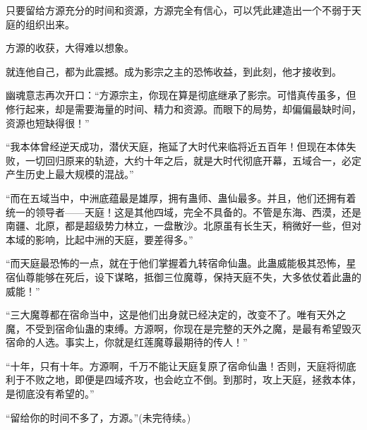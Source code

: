 \begin{this_body}
只要留给方源充分的时间和资源，方源完全有信心，可以凭此建造出一个不弱于天庭的组织出来。

方源的收获，大得难以想象。

就连他自己，都为此震撼。成为影宗之主的恐怖收益，到此刻，他才接收到。

幽魂意志再次开口：“方源宗主，你现在算是彻底继承了影宗。可惜真传虽多，但修行起来，却是需要海量的时间、精力和资源。而眼下的局势，却偏偏最缺时间，资源也短缺得很！”

“我本体曾经逆天成功，潜伏天庭，拖延了大时代来临将近五百年！但现在本体失败，一切回归原来的轨迹，大约十年之后，就是大时代彻底开幕，五域合一，必定产生历史上最大规模的混战。”

“而在五域当中，中洲底蕴最是雄厚，拥有蛊师、蛊仙最多。并且，他们还拥有着统一的领导者——天庭！这是其他四域，完全不具备的。不管是东海、西漠，还是南疆、北原，都是超级势力林立，一盘散沙。北原虽有长生天，稍微好一些，但对本域的影响，比起中洲的天庭，要差得多。”

“而天庭最恐怖的一点，就在于他们掌握着九转宿命仙蛊。此蛊威能极其恐怖，星宿仙尊能够在死后，设下谋略，抵御三位魔尊，保持天庭不失，大多依仗着此蛊的威能！”

“三大魔尊都在宿命当中，这是他们出身就已经决定的，改变不了。唯有天外之魔，不受到宿命仙蛊的束缚。方源啊，你现在是完整的天外之魔，是最有希望毁灭宿命的人选。事实上，你就是红莲魔尊最期待的传人！”

“十年，只有十年。方源啊，千万不能让天庭复原了宿命仙蛊！否则，天庭将彻底利于不败之地，即便是四域齐攻，也会屹立不倒。到那时，攻上天庭，拯救本体，是彻底没有希望的。”

“留给你的时间不多了，方源。”(未完待续。)

\end{this_body}

